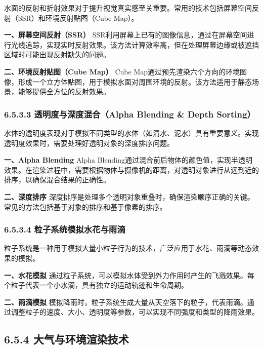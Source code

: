 水面的反射和折射效果对于提升视觉真实感至关重要。常用的技术包括屏幕空间反射（SSR）和环境反射贴图（Cube
Map）。

\textbf{一、屏幕空间反射（SSR）}
SSR利用屏幕上已有的图像信息，通过在屏幕空间进行光线追踪，实现实时反射效果。该方法计算效率高，但在处理屏幕边缘或被遮挡区域时可能出现反射缺失的问题。

\textbf{二、环境反射贴图（Cube Map）} Cube
Map通过预先渲染六个方向的环境图像，形成一个立方体贴图，用于模拟水面对周围环境的反射。该方法适用于静态场景，能够提供全方位的反射效果。

\subsubsection{6.5.3.3 透明度与深度混合（Alpha Blending \& Depth
Sorting）}\label{ux900fux660eux5ea6ux4e0eux6df1ux5ea6ux6df7ux5408alpha-blending-depth-sorting}

水体的透明度表现对于模拟不同类型的水体（如清水、泥水）具有重要意义。实现透明度效果时，需要处理好透明对象的深度排序问题。

\textbf{一、Alpha Blending} Alpha
Blending通过混合前后物体的颜色值，实现半透明效果。在渲染过程中，需要根据物体与摄像机的距离，对透明对象进行从远到近的排序，以确保混合结果的正确性。

\textbf{二、深度排序}
深度排序是处理多个透明对象重叠时，确保渲染顺序正确的关键。常见的方法包括基于对象的排序和基于像素的排序。

\subsubsection{6.5.3.4
粒子系统模拟水花与雨滴}\label{ux7c92ux5b50ux7cfbux7edfux6a21ux62dfux6c34ux82b1ux4e0eux96e8ux6ef4}

粒子系统是一种用于模拟大量小粒子行为的技术，广泛应用于水花、雨滴等动态效果的模拟。

\textbf{一、水花模拟}
通过粒子系统，可以模拟水体受到外力作用时产生的飞溅效果。每个粒子代表一个小水滴，具有独立的运动轨迹和生命周期。

\textbf{二、雨滴模拟}
模拟降雨时，粒子系统生成大量从天空落下的粒子，代表雨滴。通过调整粒子的速度、大小、透明度等参数，可以实现不同强度和类型的降雨效果。

\subsection{6.5.4
大气与环境渲染技术}\label{ux5927ux6c14ux4e0eux73afux5883ux6e32ux67d3ux6280ux672f}

